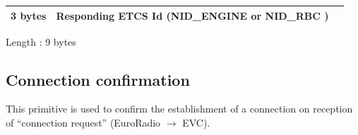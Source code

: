 \documentclass[nocc]{template/openetcs_report}
\begin{document}
\begin{longtable}{|l|l|l|}
				\hline
					 \begin{minipage}[t]{0.1\linewidth}3 bytes \end{minipage}
					&\begin{minipage}[t]{0.6\linewidth}Responding ETCS Id (NID\_ENGINE or NID\_RBC )\end{minipage}
					&\begin{minipage}[t]{0.3\linewidth}\end{minipage} \\
				\hline
			\end{longtable}
			Length : 9 bytes
\subsection{Connection confirmation}
This primitive is used to confirm the establishment of a connection on reception of "`connection request"' (EuroRadio $\rightarrow$ EVC).
\end{document}
